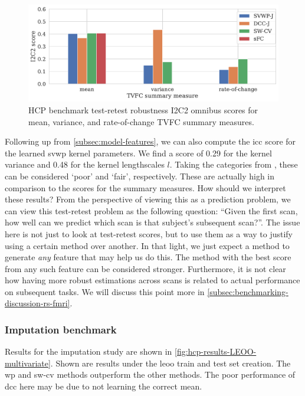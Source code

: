 \begin{figure}[t]
  \centering
  \includegraphics[width=\textwidth]{fig/hcp/d15/test_retest/I2C2/correlation_I2C2_scores}
  \caption{
    HCP benchmark test-retest robustness I2C2 omnibus scores for mean, variance, and rate-of-change TVFC summary measures.
  }
  \label{fig:hcp-results-test-retest-I2C2-scores-d15}
\end{figure}


Following up from \cref{subsec:model-features}, we can also compute the \gls{icc} score for the learned \gls{svwp} kernel parameters.
We find a score of 0.29 for the kernel variance and 0.48 for the kernel lengthscales $l$.
Taking the categories from \textcite{Cicchetti1994}, these can be considered `poor' and `fair', respectively.
These are actually high in comparison to the scores for the summary measures.
%
How should we interpret these results?
From the perspective of viewing this as a prediction problem, we can view this test-retest problem as the following question: ``Given the first scan, how well can we predict which scan is that subject's subsequent scan?''.
The issue here is not just to look at test-retest scores, but to use them as a way to justify using a certain method over another.
In that light, we just expect a method to generate \emph{any} feature that may help us do this.
The method with the best score from any such feature can be considered stronger.
%
Furthermore, it is not clear how having more robust estimations across scans is related to actual performance on subsequent tasks.
We will discuss this point more in \cref{subsec:benchmarking-discussion-rs-fmri}.

\subsubsection{Imputation benchmark}

Results for the imputation study are shown in \cref{fig:hcp-results-LEOO-multivariate}.
Shown are results under the \gls{leoo} train and test set creation.
The \gls{wp} and \gls{sw-cv} methods outperform the other methods.
The poor performance of \gls{dcc} here may be due to not learning the correct mean.


